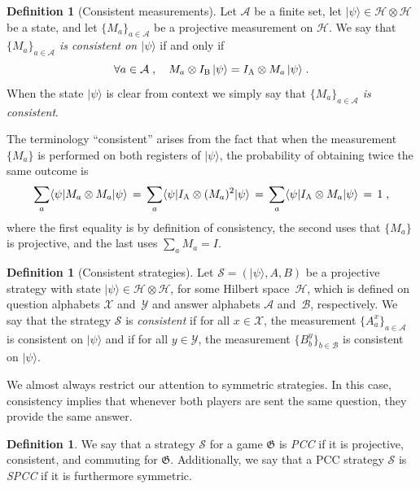 \documentclass[11pt]{article}
\theoremstyle{definition}
\newtheorem{definition}[theorem]{Definition}
\newcommand{\ket}[1]{|#1\rangle}
\newcommand{\bra}[1]{\langle#1|}
\newcommand{\Id}{\ensuremath{I}}
\newcommand{\mA}{\ensuremath{\mathcal{A}}}
\newcommand{\mH}{\ensuremath{\mathcal{H}}}
\newcommand{\game}{\mathfrak{G}}
\newcommand{\strategy}{\mathscr{S}}
\newcommand{\labelstyle}[1]{\ensuremath{\textsc{#1}}\xspace}
\newcommand{\alice}{\labelstyle{A}}
\newcommand{\bob}{\labelstyle{B}}
\renewcommand{\cal}[1]{\mathcal{#1}}
\begin{document}
\begin{definition}[Consistent measurements]
  \label{def:consistent-measurement}
  Let $\cal{A}$ be a finite set, let $\ket{\psi} \in \mH \otimes \mH$ be a
  state, and let $\{ M_a \}_{a \in \cal{A}}$ be a projective measurement on
  $\mH$.
  We say that \emph{$\{M_a\}_{a \in \cal{A}}$ is consistent on $\ket{\psi}$} if
  and only if
  \begin{equation*}
    \forall a \in \mA\;,\quad M_a \otimes \Id_\bob\, \ket{\psi}
    = \Id_\alice \otimes M_a\, \ket{\psi}\;.
  \end{equation*}
	When the state $\ket{\psi}$ is clear from context we simply say that \emph{$\{M_a\}_{a \in \cal{A}}$ is consistent}.
\end{definition}

The terminology ``consistent'' arises from the fact that when the measurement $\{M_a\}$ is performed on both registers of $\ket{\psi}$, the probability of obtaining twice the same outcome is 
\[ \sum_a \bra{\psi} M_a \otimes M_a \ket{\psi}\,=\, \sum_a \bra{\psi} \Id_\alice \otimes (M_a)^2 \ket{\psi} \,=\, \sum_a \bra{\psi} \Id_\alice \otimes M_a \ket{\psi} \,=\,1\;,\]
where the first equality is by definition of consistency, the second uses that $\{M_a\}$ is projective, and the last uses $\sum_a M_a=\Id$. 

\begin{definition}[Consistent strategies]
  \label{def:consistent-strategy}
	Let $\strategy = (\ket{\psi}, A, B)$ be a projective strategy with state
  $\ket{\psi} \in \mH \otimes \mH$, for some Hilbert space~$\mH$, which is
  defined on question alphabets $\cal{X}$ and~$\cal{Y}$ and answer alphabets
  $\cal{A}$ and~$\cal{B}$, respectively.
  We say that the strategy $\strategy$ is \emph{consistent} if for all $x \in
  \cal{X}$, the measurement $\{A^x_a\}_{a \in \cal{A}}$ is consistent on
  $\ket{\psi}$ and if for all $y \in \cal{Y}$, the measurement $\{B^y_b\}_{b \in
    \cal{B}}$ is consistent on $\ket{\psi}$.
\end{definition}

We almost always restrict our attention to symmetric strategies. In this case, consistency implies that whenever both players are sent the same question, they provide the same answer. 

\begin{definition}
  \label{def:spcc}
  We say that a strategy $\strategy$ for a game $\game$ is \emph{PCC} if it is projective, consistent, and commuting for $\game$.
  Additionally, we say that a PCC strategy $\strategy$ is \emph{SPCC} if it is furthermore symmetric.
\end{definition}
\end{document}
